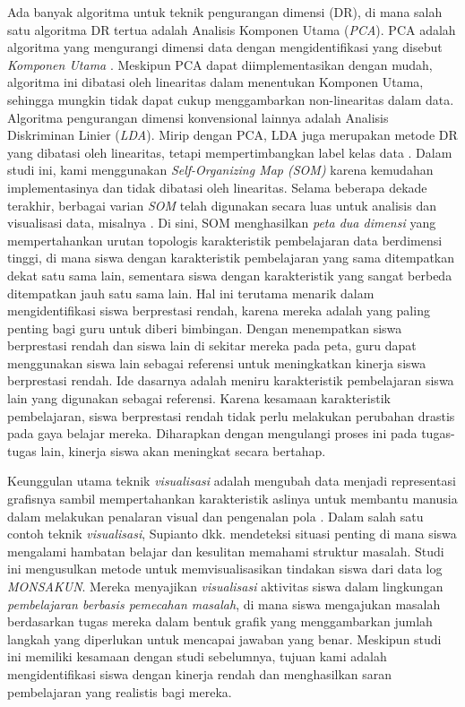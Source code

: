     Ada banyak algoritma untuk teknik pengurangan dimensi (DR), di mana salah satu algoritma DR tertua adalah Analisis Komponen Utama (\textit{PCA}). PCA adalah algoritma yang mengurangi dimensi data dengan mengidentifikasi yang disebut \textit{Komponen Utama} \citep{Ringner2008}. Meskipun PCA dapat diimplementasikan dengan mudah, algoritma ini dibatasi oleh linearitas dalam menentukan Komponen Utama, sehingga mungkin tidak dapat cukup menggambarkan non-linearitas dalam data. Algoritma pengurangan dimensi konvensional lainnya adalah Analisis Diskriminan Linier (\textit{LDA}). Mirip dengan PCA, LDA juga merupakan metode DR yang dibatasi oleh linearitas, tetapi mempertimbangkan label kelas data \citep{Hartono2017}. Dalam studi ini, kami menggunakan \textit{Self-Organizing Map (SOM)} karena kemudahan implementasinya dan tidak dibatasi oleh linearitas. Selama beberapa dekade terakhir, berbagai varian \textit{SOM} telah digunakan secara luas untuk analisis dan visualisasi data, misalnya \citep{Lestari2014}. Di sini, SOM menghasilkan \textit{peta dua dimensi} yang mempertahankan urutan topologis karakteristik pembelajaran data berdimensi tinggi, di mana siswa dengan karakteristik pembelajaran yang sama ditempatkan dekat satu sama lain, sementara siswa dengan karakteristik yang sangat berbeda ditempatkan jauh satu sama lain. Hal ini terutama menarik dalam mengidentifikasi siswa berprestasi rendah, karena mereka adalah yang paling penting bagi guru untuk diberi bimbingan. Dengan menempatkan siswa berprestasi rendah dan siswa lain di sekitar mereka pada peta, guru dapat menggunakan siswa lain sebagai referensi untuk meningkatkan kinerja siswa berprestasi rendah. Ide dasarnya adalah meniru karakteristik pembelajaran siswa lain yang digunakan sebagai referensi. Karena kesamaan karakteristik pembelajaran, siswa berprestasi rendah tidak perlu melakukan perubahan drastis pada gaya belajar mereka. Diharapkan dengan mengulangi proses ini pada tugas-tugas lain, kinerja siswa akan meningkat secara bertahap.
    
    Keunggulan utama teknik \textit{visualisasi} adalah mengubah data menjadi representasi grafisnya sambil mempertahankan karakteristik aslinya untuk membantu manusia dalam melakukan penalaran visual dan pengenalan pola \citep{Bara2018}. Dalam salah satu contoh teknik \textit{visualisasi}, Supianto dkk. \citep{SupiantoHayashiHirashima2016} mendeteksi situasi penting di mana siswa mengalami hambatan belajar dan kesulitan memahami struktur masalah. Studi ini mengusulkan metode untuk memvisualisasikan tindakan siswa dari data log \textit{MONSAKUN}. Mereka menyajikan \textit{visualisasi} aktivitas siswa dalam lingkungan \textit{pembelajaran berbasis pemecahan masalah}, di mana siswa mengajukan masalah berdasarkan tugas mereka dalam bentuk grafik yang menggambarkan jumlah langkah yang diperlukan untuk mencapai jawaban yang benar. Meskipun studi ini memiliki kesamaan dengan studi sebelumnya, tujuan kami adalah mengidentifikasi siswa dengan kinerja rendah dan menghasilkan saran pembelajaran yang realistis bagi mereka.
    
